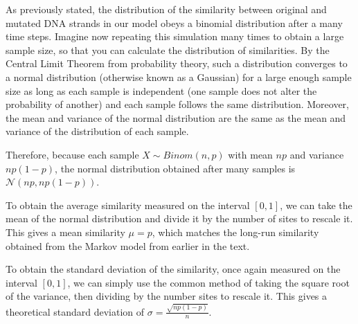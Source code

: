 \documentclass{article}
\begin{document}
		As previously stated, the distribution of the similarity between original and mutated DNA strands in our model obeys a binomial distribution after a many time steps. Imagine now repeating this simulation many times to obtain a large sample size, so that you can calculate the distribution of similarities. By the Central Limit Theorem from probability theory, such a distribution converges to a normal distribution (otherwise known as a Gaussian) for a large enough sample size as long as each sample is independent (one sample does not alter the probability of another) and each sample follows the same distribution. Moreover, the mean and variance of the normal distribution are the same as the mean and variance of the distribution of each sample.
		
		Therefore, because each sample $X\sim Binom(n,p)$ with mean $np$ and variance $np(1-p)$, the normal distribution obtained after many samples is $\mathcal{N}(np,np(1-p))$.
		
		To obtain the average similarity measured on the interval $[0,1]$, we can take the mean of the normal distribution and divide it by the number of sites to rescale it. This gives a mean similarity $\mu = p$, which matches the long-run similarity obtained from the Markov model from earlier in the text.
		
		To obtain the standard deviation of the similarity, once again measured on the interval $[0,1]$, we can simply use the common method of taking the square root of the variance, then dividing by the number sites to rescale it. This gives a theoretical standard deviation of $\sigma = \frac{\sqrt{np(1-p)}}{n}$.
\end{document}
